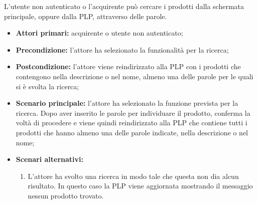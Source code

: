 
\label{ricerca-prodotti-acquirente}

L'utente non autenticato o l'acquirente può cercare i prodotti dalla schermata principale, oppure dalla PLP, attraverso delle parole.
\begin{itemize}
    \item \textbf{Attori primari:} acquirente o utente non autenticato;
    \item \textbf{Precondizione:} l'attore ha selezionato la funzionalità per la ricerca;
    \item \textbf{Postcondizione:} l'attore viene reindirizzato alla PLP con i prodotti che contengono nella descrizione o nel nome, almeno una delle parole per le quali si è svolta la ricerca;
    \item \textbf{Scenario principale:} l'attore ha selezionato la funzione prevista per la ricerca. Dopo aver inserito le parole per individuare il prodotto, conferma la voltà di procedere e viene quindi reindirizzato alla PLP che contiene tutti i prodotti che hanno almeno una delle parole indicate, nella descrizione o nel nome;
    \item \textbf{Scenari alternativi:}
    \begin{enumerate}[label=\lett]
        \item L'attore ha svolto una ricerca in modo tale che questa non dia alcun risultato. In questo caso la PLP viene aggiornata mostrando il messaggio nessun prodotto trovato.
    \end{enumerate}
\end{itemize}


\label{filtro-prodotti-acquirente}


